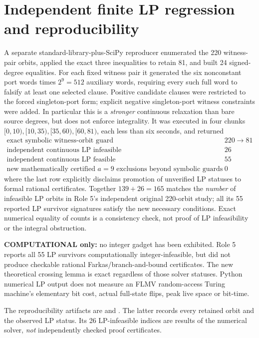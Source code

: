 \documentclass[11pt]{article}
\begin{document}
\section{Independent finite LP regression and reproducibility}
A separate standard-library-plus-SciPy reproducer enumerated the 220 witness-pair orbits, applied the exact three inequalities to retain 81, and built 24 signed-degree equalities. For each fixed witness pair it generated the six nonconstant port words times $2^9=512$ auxiliary words, requiring every such full word to falsify at least one selected clause. Positive candidate clauses were restricted to the forced singleton-port form; explicit negative singleton-port witness constraints were added. In particular this is a \emph{stronger} continuous relaxation than bare source degrees, but does not enforce integrality. It was executed in four chunks $[0,10),[10,35),[35,60),[60,81)$, each less than six seconds, and returned
\[
\begin{array}{c|r}
\text{exact symbolic witness-orbit guard} & 220\longrightarrow81\\
\text{independent continuous LP infeasible} & 26\\
\text{independent continuous LP feasible} &55\\
\text{new mathematically certified }a=9\text{ exclusions beyond symbolic guards}&0
\end{array}
\]
where the last row explicitly disclaims promotion of unverified LP statuses to formal rational certificates. Together $139+26=165$ matches the \emph{number} of infeasible LP orbits in Role 5's independent original 220-orbit study; all its 55 reported LP survivor signatures satisfy the new necessary conditions. Exact numerical equality of counts is a consistency check, not proof of LP infeasibility or the integral obstruction.

\textbf{COMPUTATIONAL only:} no integer gadget has been exhibited. Role 5 reports all 55 LP survivors computationally integer-infeasible, but did not produce checkable rational Farkas/branch-and-bound certificates. The new theoretical crossing lemma is exact regardless of those solver statuses. Python numerical LP output does not measure an FLMV random-access Turing machine's elementary bit cost, actual full-state flips, peak live space or bit-time.

The reproducibility artifacts are
and
.
The latter records every retained orbit and the observed LP status. Its 26 LP-infeasible indices are results of the numerical solver, \emph{not} independently checked proof certificates.
\end{document}
